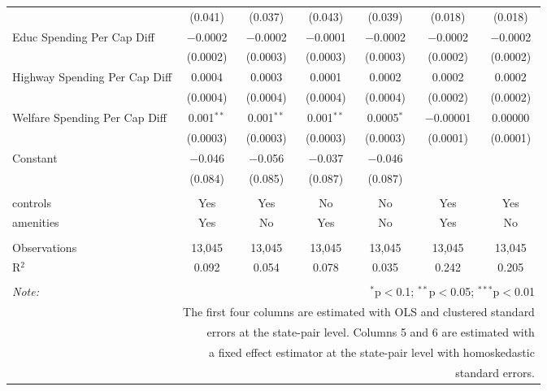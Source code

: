\begin{table}[!htbp]
\begin{tabular}{@{\extracolsep{5pt}}lcccccc}
  & (0.041) & (0.037) & (0.043) & (0.039) & (0.018) & (0.018) \\ 
  Educ Spending Per Cap Diff & $-$0.0002 & $-$0.0002 & $-$0.0001 & $-$0.0002 & $-$0.0002 & $-$0.0002 \\ 
  & (0.0002) & (0.0003) & (0.0003) & (0.0003) & (0.0002) & (0.0002) \\ 
  Highway Spending Per Cap Diff & 0.0004 & 0.0003 & 0.0001 & 0.0002 & 0.0002 & 0.0002 \\ 
  & (0.0004) & (0.0004) & (0.0004) & (0.0004) & (0.0002) & (0.0002) \\ 
  Welfare Spending Per Cap Diff & 0.001$^{**}$ & 0.001$^{**}$ & 0.001$^{**}$ & 0.0005$^{*}$ & $-$0.00001 & 0.00000 \\ 
  & (0.0003) & (0.0003) & (0.0003) & (0.0003) & (0.0001) & (0.0001) \\ 
  Constant & $-$0.046 & $-$0.056 & $-$0.037 & $-$0.046 &  &  \\ 
  & (0.084) & (0.085) & (0.087) & (0.087) &  &  \\ 
 \hline \\[-1.8ex] 
controls & Yes & Yes & No & No & Yes & Yes \\ 
amenities & Yes & No & Yes & No & Yes & No \\ 
\hline \\[-1.8ex] 
Observations & 13,045 & 13,045 & 13,045 & 13,045 & 13,045 & 13,045 \\ 
R$^{2}$ & 0.092 & 0.054 & 0.078 & 0.035 & 0.242 & 0.205 \\ 
\hline 
\hline \\[-1.8ex] 
\textit{Note:}  & \multicolumn{6}{r}{$^{*}$p$<$0.1; $^{**}$p$<$0.05; $^{***}$p$<$0.01} \\ 
 & \multicolumn{6}{r}{The first four columns are estimated with OLS and clustered standard} \\ 
 & \multicolumn{6}{r}{ errors at the state-pair level. Columns 5 and 6 are estimated with} \\ 
 & \multicolumn{6}{r}{a fixed effect estimator at the state-pair level with homoskedastic} \\ 
 & \multicolumn{6}{r}{standard errors.} \\ 
\end{tabular} 
\end{table} 
